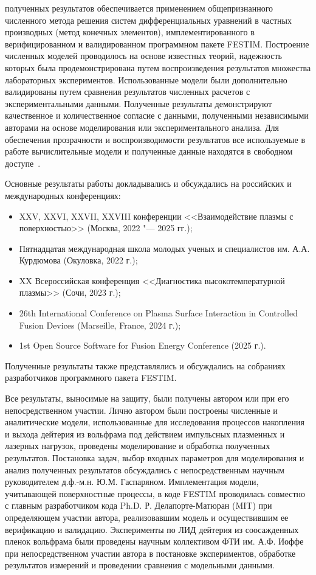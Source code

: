 {\reliability} полученных результатов обеспечивается применением общепризнанного численного метода решения систем дифференциальных уравнений в частных производных (метод конечных элементов), имплементированного в верифицированном и валидированном программном пакете FESTIM. Построение численных моделей проводилось на основе известных теорий, надежность которых была продемонстрирована путем воспроизведения результатов множества лабораторных экспериментов. Использованные модели были дополнительно валидированы путем сравнения результатов численных расчетов с экспериментальными данными. Полученные результаты демонстрируют качественное и количественное согласие с данными, полученными независимыми авторами на основе моделирования или экспериментального анализа. Для обеспечения прозрачности и воспроизводимости результатов все используемые в работе вычислительные модели и полученные данные находятся в свободном доступе~\cite{Kulagin_PhD_2025}.

{\probation}
Основные результаты работы докладывались и обсуждались на российских и международных конференциях:
\begin{itemize}
    \item XXV, XXVI, XXVII, XXVIII конференции <<Взаимодействие плазмы с поверхностью>> (Москва, 2022 "--- 2025 гг.);
    \item Пятнадцатая международная школа молодых ученых и специалистов им. А.А. Курдюмова (Окуловка, 2022 г.);
    \item XX Всероссийская конференция <<Диагностика высокотемпературной плазмы>> (Сочи, 2023 г.);
    \item 26th International Conference on Plasma Surface Interaction in Controlled Fusion Devices (Marseille, France, 2024 г.);
    \item 1st Open Source Software for Fusion Energy Conference (2025 г.).
\end{itemize}
Полученные результаты также представлялись и обсуждались на собраниях разработчиков программного пакета FESTIM. 

{\contribution} Все результаты, выносимые на защиту, были получены автором или при его непосредственном участии. Лично автором были построены численные и аналитические модели, использованные для исследования процессов накопления и выхода дейтерия из вольфрама под действием импульсных плазменных и лазерных нагрузок, проведены моделирование и обработка полученных результатов. Постановка задач, выбор входных параметров для моделирования и анализ полученных результатов обсуждались с непосредственным научным руководителем д.ф.-м.н. Ю.М. Гаспаряном. Имплементация модели, учитывающей поверхностные процессы, в коде FESTIM проводилась совместно с главным разработчиком кода Ph.D. Р. Делапорте-Матюран (MIT) при определяющем участии автора, реализовавшим модель и осуществившим ее верификацию и валидацию. Эксперименты по ЛИД дейтерия из соосажденных пленок вольфрама были проведены научным коллективом ФТИ им. А.Ф. Иоффе при непосредственном участии автора в постановке экспериментов, обработке результатов измерений и проведении сравнения с модельными данными.

